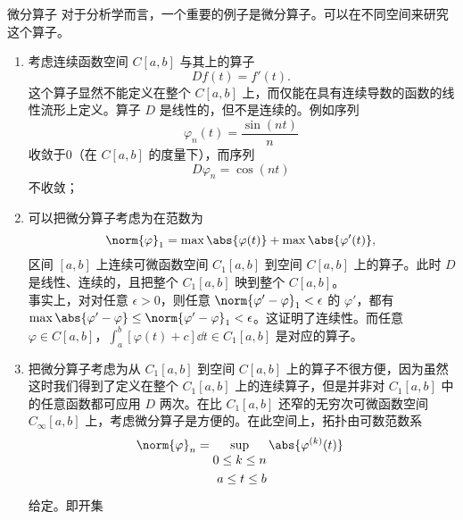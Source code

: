 \begin{example}{微分算子}
对于分析学而言，一个重要的例子是微分算子。可以在不同空间来研究这个算子。

\begin{enumerate}
\item 考虑连续函数空间 $C[a,b]$ 与其上的算子 
\begin{equation}
Df(t)=f'(t).~
\end{equation}
这个算子显然不能定义在整个 $C[a,b]$ 上，而仅能在具有连续导数的函数的线性流形上定义。算子 $D$ 是线性的，但不是连续的。例如序列
\begin{equation}
\varphi_n(t)=\frac{\sin(nt)}{n}~
\end{equation}
收敛于0（在 $C[a,b]$ 的度量下），而序列
\begin{equation}
D\varphi_n=\cos(nt)~
\end{equation}
不收敛；
\item 可以把微分算子考虑为在范数为
\begin{equation}
\norm{\varphi}_1=\max\abs{\varphi(t)}+\max\abs{\varphi'(t)},~
\end{equation}
区间 $[a,b]$ 上连续可微函数空间 $C_1[a,b]$ 到空间 $C[a,b]$ 上的算子。此时 $D$ 是线性、连续的，且把整个 $C_1[a,b]$ 映到整个 $C[a,b]$。\\
事实上，对对任意 $\epsilon>0$，则任意 $\norm{\varphi'-\varphi}_1<\epsilon$ 的 $\varphi'$，都有 $\max\abs{\varphi'-\varphi}\leq \norm{\varphi'-\varphi}_1<\epsilon$。这证明了连续性。而任意 $\varphi\in C[a,b]$，$\int_a^b[\varphi(t)+c]\dd t\in C_1[a,b]$ 是对应的算子。

\item 把微分算子考虑为从 $C_1[a,b]$ 到空间 $C[a,b]$ 上的算子不很方便，因为虽然这时我们得到了定义在整个 $C_1[a,b]$ 上的连续算子，但是并非对 $C_1[a,b]$ 中的任意函数都可应用 $D$ 两次。在比 $C_1[a,b]$ 还窄的无穷次可微函数空间 $C_\infty[a,b]$ 上，考虑微分算子是方便的。在此空间上，拓扑由可数范数系
\begin{equation}
\norm{\varphi}_n=\sup_{\begin{aligned}
0\leq k\leq n\\a\leq t\leq b
\end{aligned}}\abs{\varphi^{(k)}(t)}~
\end{equation}
给定。即开集
\end{enumerate}
\end{example}



